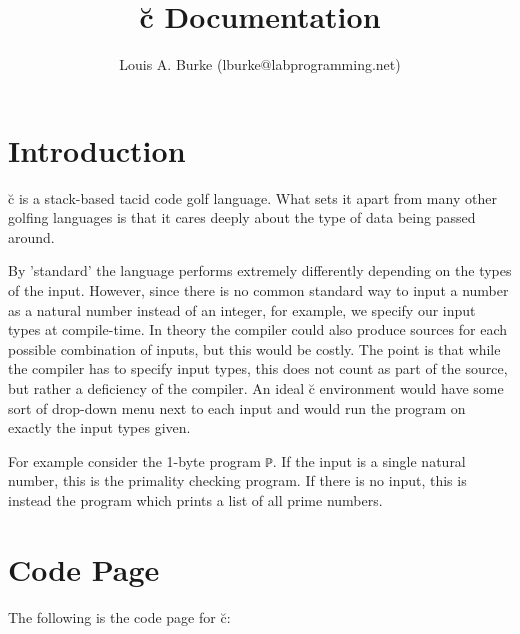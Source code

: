 \documentclass{article}
\title{\u{c} Documentation}
\author{Louis A. Burke (lburke@labprogramming.net)}
\begin{document}
\maketitle

\tableofcontents
\clearpage

\section{Introduction}

\u{c} is a stack-based tacid code golf language. What sets it apart from many
other golfing languages is that it cares deeply about the type of data being
passed around.

By 'standard' the language performs extremely differently depending on the types
of the input. However, since there is no common standard way to input a number
as a natural number instead of an integer, for example, we specify our input
types at compile-time. In theory the compiler could also produce sources for
each possible combination of inputs, but this would be costly. The point is that
while the compiler has to specify input types, this does not count as part of
the source, but rather a deficiency of the compiler. An ideal \u{c} environment
would have some sort of drop-down menu next to each input and would run the
program on exactly the input types given.

For example consider the 1-byte program \verb|ℙ|. If the input is a single
natural number, this is the primality checking program. If there is no input,
this is instead the program which prints a list of all prime numbers.

\section{Code Page}

The following is the code page for \u{c}:
\end{document}
